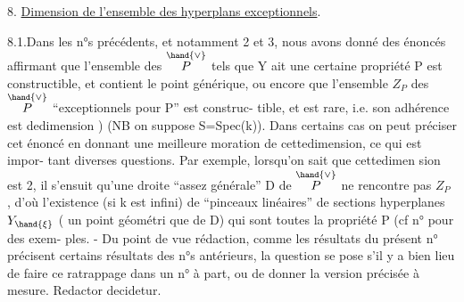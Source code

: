 
8. \uline{Dimension de l'ensemble des hyperplans exceptionnels}.

8.1.Dans les n°s précédents, et notamment 2 et 3, nous avons donné des
énoncés affirmant que l'ensemble des \hand{$\xi\in$} $\overset{\hand{\vee}}{P}$ tels que Y ait une certaine
propriété P est constructible, et contient le point générique\inserted{$\eta$},  ou
encore que l'ensemble $Z_P$ des \hand{$\xi\in$} $\overset{\hand{\vee}}{P}$ ``exceptionnels pour P'' est construc-%
tible, et est rare, i.e. son adhérence est dedimension \hand{$\geq$} ) 
(NB on suppose S=Spec(k)). Dans certains cas on peut préciser cet énoncé
en donnant une meilleure moration de cettedimension, ce qui est impor-%
tant  diverses questions. Par exemple, lorsqu'on sait que cettedimen
sion est \hand{$\geq$} 2, il s'ensuit qu'une droite ``assez générale'' D de $\overset{\hand{\vee}}{P}$
ne rencontre pas $Z_P$ , d'où l'existence (si k est infini) de ``pinceaux
linéaires'' de sections hyperplanes  $Y_{\hand{\xi}}$ (\hand{$\xi$} un point géométri
que de D) qui sont toutes la propriété P (cf n° \inserted{$-\ -\ -\ -$} pour des exem-%
ples. - Du point de vue rédaction, comme les résultats du présent n°
précisent certains résultats des n°s antérieurs, la question se pose s'il
y a bien lieu de faire ce ratrappage dans un n° à part, ou de donner la
version précisée à mesure. Redactor decidetur.


